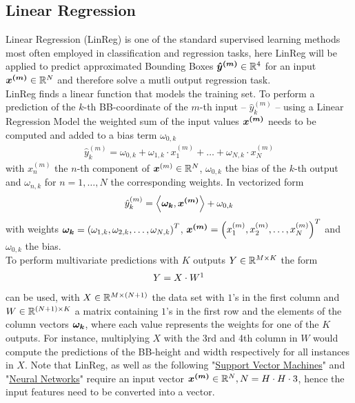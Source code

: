 \subsection{Linear Regression}\label{subsec:linear-regression}
Linear Regression (LinReg) is one of the standard supervised learning methods most often employed in classification and regression tasks, here LinReg will be applied to predict approximated Bounding Boxes $\bm{\hat{y}^{(m)}}\in\mathbb{R}^4$ for an input $\bm{x^{(m)}}\in\mathbb{R}^N$ and therefore solve a mutli output regression task.\\
LinReg finds a linear function that models the training set.
To perform a prediction of the $k$-th BB-coordinate of the $m$-th input – $\hat{y}^{(m)}_k$ – using a Linear Regression Model the weighted sum of the input values $\bm{x^{(m)}}$ needs to be computed and added to a bias term $\omega_{0,k}$
\begin{align}
    \hat{y}^{(m)}_k = \omega_{0,k} + \omega_{1,k} \cdot x^{(m)}_1 + \ldots + \omega_{N,k} \cdot x^{(m)}_N
\end{align}
with $x^{(m)}_n$ the $n$-th component of $\bm{x}^{(m)}\in \mathbb{R}^N$, $\omega_{0, k}$ the bias of the $k$-th output and $\omega_{n,k}$ for $n=1,\ldots, N$ the corresponding weights.
In vectorized form
\begin{align}
    \hat{y}_k^{(m)} =
    \left\langle\bm{\omega_k}, \bm{x^{(m)}}\right\rangle + \omega_{0, k}
\end{align}
with weights $\bm{\omega_k}=\left(\omega_{1,k}, \omega_{2, k}, \ldots, \omega_{N, k}\right)^T$, $\bm{x^{(m)}} = \left(x_1^{(m)}, x_2^{(m)}, \ldots, x_N^{(m)}\right)^T$ and $\omega_{0, k}$ the bias.\\
To perform multivariate predictions with $K$ outputs $Y\in\mathbb{R}^{M\times K}$ the form
\begin{align}
    Y = X \cdot W\footnotemark
\end{align}
can be used, with $X\in\mathbb{R}^{M\times (N+1)}$ the data set with $1$'s in the first column and $W\in \mathbb{R}^{(N+1)\times K}$ a matrix containing $1$'s in the first row and the elements of the column vectors $\bm{\omega_k}$, where each value represents the weights for one of the $K$ outputs.
For instance, multiplying $X$ with the 3rd and 4th column in $W$ would compute the predictions of the BB-height and width respectively for all instances in $X$.
Note that LinReg, as well as the following "\hyperref[subsec:support-vector-machines]{Support Vector Machines}" and "\hyperref[subsec:neural-networks]{Neural Networks}" require an input vector $\bm{x^{(m)}}\in \mathbb{R}^N, N=H\cdot H\cdot 3$, hence the input features need to be converted into a vector.
